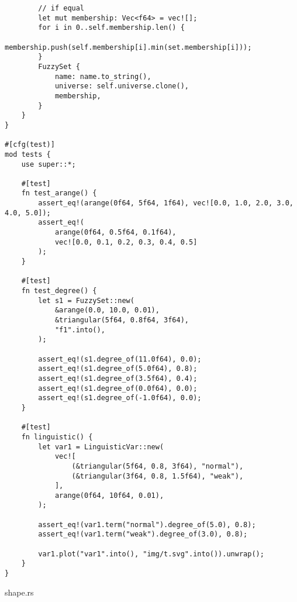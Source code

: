 \begin{verbatim}
        // if equal
        let mut membership: Vec<f64> = vec![];
        for i in 0..self.membership.len() {
            membership.push(self.membership[i].min(set.membership[i]));
        }
        FuzzySet {
            name: name.to_string(),
            universe: self.universe.clone(),
            membership,
        }
    }
}

#[cfg(test)]
mod tests {
    use super::*;

    #[test]
    fn test_arange() {
        assert_eq!(arange(0f64, 5f64, 1f64), vec![0.0, 1.0, 2.0, 3.0, 4.0, 5.0]);
        assert_eq!(
            arange(0f64, 0.5f64, 0.1f64),
            vec![0.0, 0.1, 0.2, 0.3, 0.4, 0.5]
        );
    }

    #[test]
    fn test_degree() {
        let s1 = FuzzySet::new(
            &arange(0.0, 10.0, 0.01),
            &triangular(5f64, 0.8f64, 3f64),
            "f1".into(),
        );

        assert_eq!(s1.degree_of(11.0f64), 0.0);
        assert_eq!(s1.degree_of(5.0f64), 0.8);
        assert_eq!(s1.degree_of(3.5f64), 0.4);
        assert_eq!(s1.degree_of(0.0f64), 0.0);
        assert_eq!(s1.degree_of(-1.0f64), 0.0);
    }

    #[test]
    fn linguistic() {
        let var1 = LinguisticVar::new(
            vec![
                (&triangular(5f64, 0.8, 3f64), "normal"),
                (&triangular(3f64, 0.8, 1.5f64), "weak"),
            ],
            arange(0f64, 10f64, 0.01),
        );

        assert_eq!(var1.term("normal").degree_of(5.0), 0.8);
        assert_eq!(var1.term("weak").degree_of(3.0), 0.8);

        var1.plot("var1".into(), "img/t.svg".into()).unwrap();
    }
}

\end{verbatim}
\noindent shape.rs
